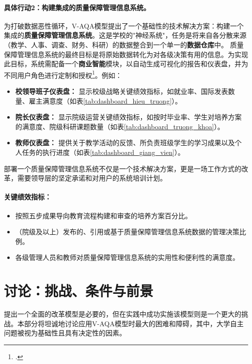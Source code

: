 \paragraph{具体行动2：构建集成的质量保障管理信息系统。}
为打破数据恶性循环，V-AQA模型提出了一个基础性的技术解决方案：构建一个集成的\textbf{质量保障管理信息系统}。这是学校的"神经系统"，任务是将来自各分散来源（教学、人事、调查、财务、科研）的数据整合到一个单一的\textbf{数据仓库}中。
质量保障管理信息系统的最终目标是将原始数据转化为对各级决策有用的信息。为实现此目标，系统需配备一个\textbf{商业智能}模块，以自动生成可视化的报告和仪表盘，并为不同用户角色进行定制和授权\footcite{educause_bi_2022}。例如：
\begin{itemize}
    \item \textbf{校领导班子仪表盘：} 显示校级战略关键绩效指标，如就业率、国际发表数量、雇主满意度（如表\ref{tab:dashboard_hieu_truong}）。
    \item \textbf{院长仪表盘：} 显示院级运营关键绩效指标，如按时毕业率、学生对培养方案的满意度、院级科研课题数量（如表\ref{tab:dashboard_truong_khoa}）。
    \item \textbf{教师仪表盘：} 提供关于教学活动的反馈、所负责班级学生的学习成果以及个人任务的执行进度（如表\ref{tab:dashboard_giang_vien}）。
\end{itemize}
部署一个质量保障管理信息系统不仅是一个技术解决方案，更是一场工作方式的改革，需要领导层的坚定承诺和对用户的系统培训计划。

\paragraph{关键绩效指标：}
\begin{itemize}
    \item 按照五步成果导向教育流程构建和审查的培养方案百分比。
    \item （院级及以上）发布的、引用或基于质量保障管理信息系统数据的管理决策比例。
    \item 各级管理人员和教师对质量保障管理信息系统的实用性和便利性的满意度。
\end{itemize}





\section{讨论：挑战、条件与前景}
\label{sec:ban_luan_trien_vong}

提出一个全面的改革模型是必要的，但在实践中成功实施该模型则是一个更大的挑战。本部分将坦诚地讨论应用V-AQA模型时最大的困难和障碍，其中，大学自主问题被视为基础性且具有决定性的因素。

